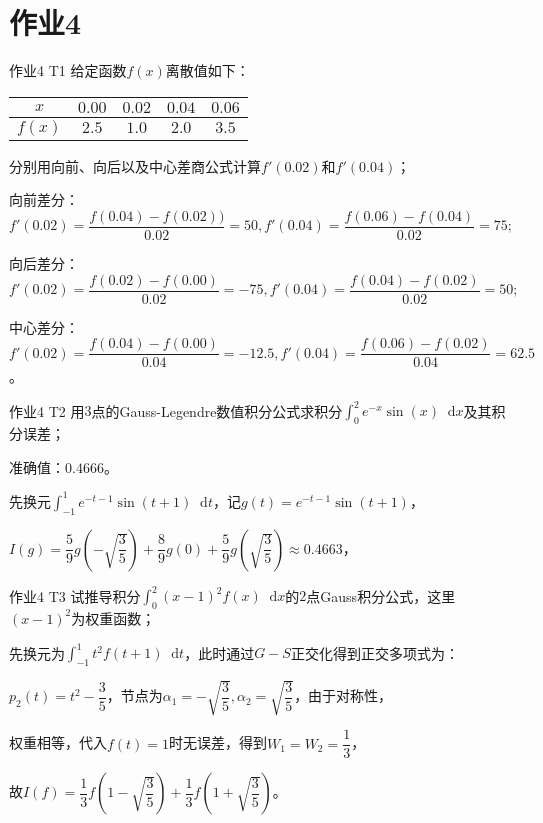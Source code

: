 \documentclass[10pt]{beamer}
\newcommand*{\diff}{\mathop{}\!\mathrm{d}}
\begin{document}
\section{作业4}
    \begin{frame}{作业4 T1}
        给定函数$f(x)$离散值如下：
        \begin{table}[H]
            \begin{center}
                \begin{tabular}{|c|c|c|c|c|}
                \hline
                $x$ & $0.00$ & $0.02$ & $0.04$ & $0.06$ \\
                \hline
                $f(x)$ & $2.5$ & $1.0$ & $2.0$ & $3.5$ \\
                \hline
                \end{tabular}
            \end{center}
        \end{table}
        分别用向前、向后以及中心差商公式计算$f'(0.02)$和$f'(0.04)$；\vspace{1cm}

        \pause 向前差分：$f'(0.02)=\dfrac{f(0.04)-f(0.02))}{0.02}=50,f'(0.04)=\dfrac{f(0.06)-f(0.04)}{0.02}=75;$

        \pause 向后差分：$f'(0.02)=\dfrac{f(0.02)-f(0.00)}{0.02}=-75,f'(0.04)=\dfrac{f(0.04)-f(0.02)}{0.02}=50;$

        \pause 中心差分：$f'(0.02)=\dfrac{f(0.04)-f(0.00)}{0.04}=-12.5,f'(0.04)=\dfrac{f(0.06)-f(0.02)}{0.04}=62.5$。
    \end{frame}
    \begin{frame}{作业4 T2}
        用$3$点的Gauss-Legendre数值积分公式求积分$\int_0^2 e^{-x}\sin(x)\diff x$及其积分误差；\vspace{1cm}

        \pause 准确值：$0.4666$。

        \pause 先换元$\int_{-1}^1 e^{-t-1}\sin(t+1)\diff t$，记$g(t)=e^{-t-1}\sin(t+1)$，

        \pause $I(g)=\dfrac59 g\left(-\sqrt{\dfrac35}\right)+\dfrac89 g(0)+\dfrac59 g\left(\sqrt{\dfrac35}\right)\approx0.4663$，
    \end{frame}
    \begin{frame}{作业4 T3}
        试推导积分$\int_0^2 (x-1)^2 f(x)\diff x$的$2$点Gauss积分公式，这里$(x-1)^2$为权重函数；\vspace{1cm}

        \pause 先换元为$\int_{-1}^1 t^2 f(t+1)\diff t$，此时通过$G-S$正交化得到正交多项式为：

        \pause $p_2(t)=t^2-\dfrac35$，节点为$\alpha_1=-\sqrt{\dfrac35},\alpha_2=\sqrt{\dfrac35}$，由于对称性，

        \pause 权重相等，代入$f(t)=1$时无误差，得到$W_1=W_2=\dfrac13$，

        \pause 故$I(f)=\dfrac13 f\left(1-\sqrt{\dfrac35}\right)+\dfrac13f\left(1+\sqrt{\dfrac35}\right)$。
    \end{frame}
\end{document}
